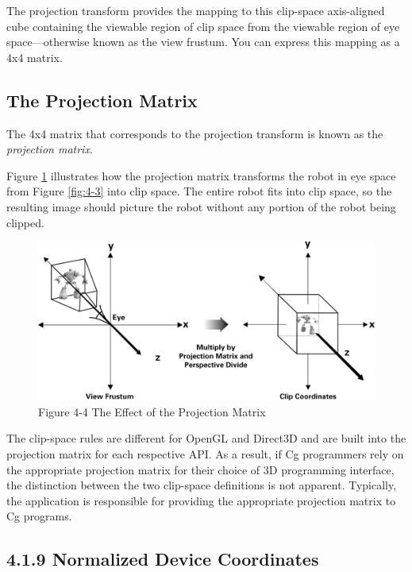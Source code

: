 \documentclass{book}
\begin{document}
The projection transform provides the mapping to this clip-space axis-aligned cube containing the viewable region of clip space from the viewable region of eye space—otherwise known as the view frustum. You can express this mapping as a 4x4 matrix.

\subsection*{The Projection Matrix}

The 4x4 matrix that corresponds to the projection transform is known as the \textit{projection matrix}.

Figure \ref{fig:4-4} illustrates how the projection matrix transforms the robot in eye space from Figure \ref{fig:4-3} into clip space. The entire robot fits into clip space, so the resulting image should picture the robot without any portion of the robot being clipped.

\begin{figure}
    \centering
    \includegraphics[width=1\linewidth]{Images/fig4_4.jpg}
    \caption{Figure 4-4 The Effect of the Projection Matrix}
    \label{fig:4-4}
\end{figure}

The clip-space rules are different for OpenGL and Direct3D and are built into the projection matrix for each respective API. As a result, if Cg programmers rely on the appropriate projection matrix for their choice of 3D programming interface, the distinction between the two clip-space definitions is not apparent. Typically, the application is responsible for providing the appropriate projection matrix to Cg programs.

\subsection{4.1.9 Normalized Device Coordinates}
\end{document}
